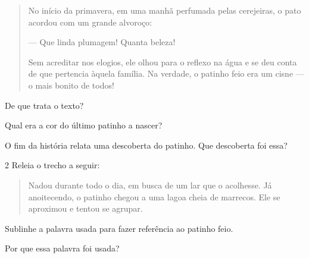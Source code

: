 \begin{quote}
No início da primavera, em uma manhã perfumada pelas cerejeiras, o pato
acordou com um grande alvoroço:

--- Que linda plumagem! Quanta beleza!

Sem acreditar nos elogios, ele olhou para o reflexo na água e se deu
conta de que pertencia àquela família. Na verdade, o patinho feio era um
cisne --- o mais bonito de todos!

\end{quote}

\begin{escolha}
\item De que trata o texto?


\item Qual era a cor do último patinho a nascer?


\item O fim da história relata uma descoberta do patinho. Que descoberta
foi essa?

\end{escolha}

\num{2} Releia o trecho a seguir:

\begin{quote}
Nadou durante todo o dia, em busca de um lar que o acolhesse. Já
anoitecendo, o patinho chegou a uma lagoa cheia de marrecos. Ele
se aproximou e tentou se agrupar.
\end{quote}

\begin{escolha}
\item Sublinhe a palavra usada para fazer referência ao patinho feio.

\item Por que essa palavra foi usada?

\end{escolha}

